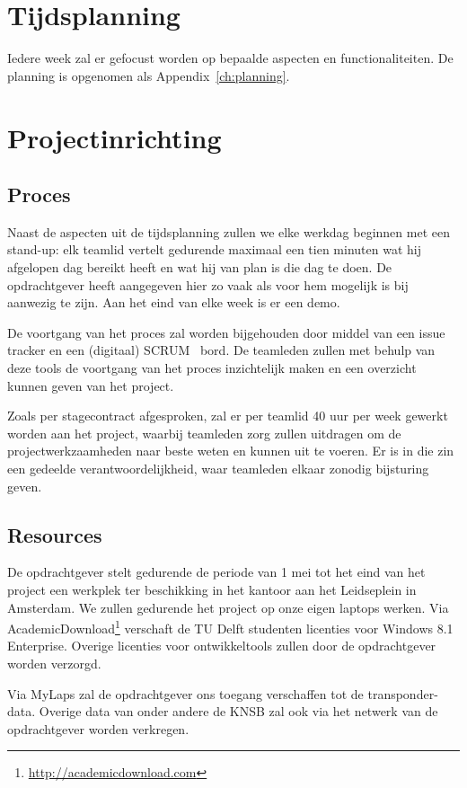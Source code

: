 \section{Tijdsplanning}
Iedere week zal er gefocust worden op bepaalde aspecten en functionaliteiten. De planning is opgenomen als Appendix~\ref{ch:planning}.

\section{Projectinrichting}

\subsection{Proces}
Naast de aspecten uit de tijdsplanning zullen we elke werkdag beginnen met een stand-up: elk teamlid vertelt gedurende maximaal een tien minuten wat hij afgelopen dag bereikt heeft en wat hij van plan is die dag te doen. De opdrachtgever heeft aangegeven hier zo vaak als voor hem mogelijk is bij aanwezig te zijn. Aan het eind van elke week is er een demo.

De voortgang van het proces zal worden bijgehouden door middel van een issue tracker en een (digitaal) SCRUM~\cite{scrum} bord. De teamleden zullen met behulp van deze tools de voortgang van het proces inzichtelijk maken en een overzicht kunnen geven van het project.

Zoals per stagecontract afgesproken, zal er per teamlid 40 uur per week gewerkt worden aan het project, waarbij teamleden zorg zullen uitdragen om de projectwerkzaamheden naar beste weten en kunnen uit te voeren. Er is in die zin een gedeelde verantwoordelijkheid, waar teamleden elkaar zonodig bijsturing geven. 

\subsection{Resources}
De opdrachtgever stelt gedurende de periode van 1 mei tot het eind van het project een werkplek ter beschikking in het kantoor aan het Leidseplein in Amsterdam. We zullen gedurende het project op onze eigen laptops werken. Via AcademicDownload\footnote{\url{http://academicdownload.com}} verschaft de TU Delft studenten licenties voor Windows 8.1 Enterprise. Overige licenties voor ontwikkeltools zullen door de opdrachtgever worden verzorgd.

Via MyLaps zal de opdrachtgever ons toegang verschaffen tot de transponder-data. Overige data van onder andere de KNSB zal ook via het netwerk van de opdrachtgever worden verkregen.

